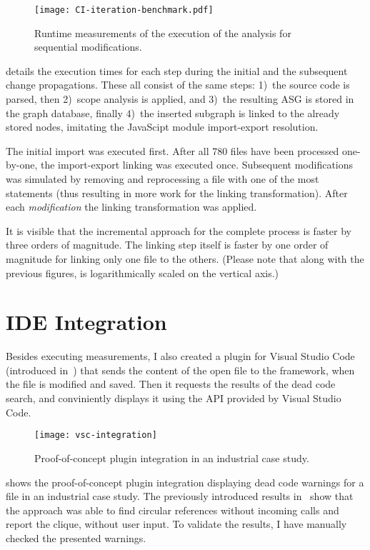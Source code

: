 \begin{figure}[!htb]
  \centering
  \texttt{[image: CI-iteration-benchmark.pdf]}
  \caption{Runtime measurements of the execution of the analysis for sequential modifications.}
  \label{fig:CI-iteration-benchmark}
\end{figure}

 details the execution times for each step during the initial and the subsequent change propagations. These all consist of the same steps: 1)~the source code is parsed, then 2)~scope analysis is applied, and 3)~the resulting ASG is stored in the graph database, finally 4)~the inserted subgraph is linked to the already stored nodes, imitating the JavaScipt module import-export resolution.

The initial import was executed first. After all 780 files have been processed one-by-one, the import-export linking was executed once. Subsequent modifications was simulated by removing and reprocessing a file with one of the most  statements (thus resulting in more work for the linking transformation). After each \emph{modification} the linking transformation was applied.

It is visible that the incremental approach for the complete process is faster by three orders of magnitude. The linking step itself is faster by one order of magnitude for linking only one file to the others. (Please note that along with the previous figures,  is logarithmically scaled on the vertical axis.)


\section{IDE Integration}
\label{sect:ide-integration}
Besides executing measurements, I also created a plugin for Visual Studio Code (introduced in~) that sends the content of the open file to the framework, when the file is modified and saved. Then it requests the results of the dead code search, and conviniently displays it using the API provided by Visual Studio Code.

\begin{figure}[!htb]
  \centering
  \texttt{[image: vsc-integration]}
  \caption{Proof-of-concept plugin integration in an industrial case study.}
  \label{fig:vsc-integration}
\end{figure}

 shows the proof-of-concept plugin integration displaying dead code warnings for a file in an industrial case study. The previously introduced results in~ show that the approach was able to find circular references without incoming calls and report the clique, without user input. To validate the results, I have manually checked the presented warnings.


